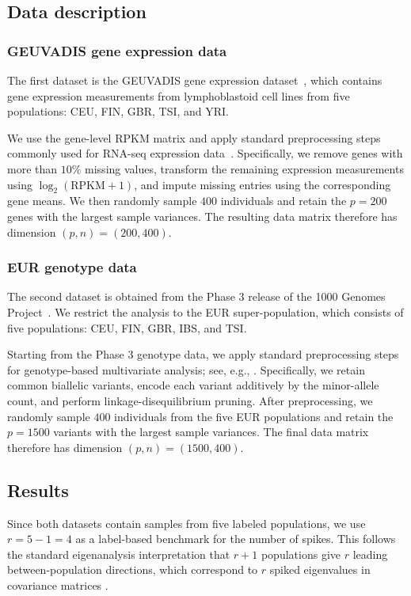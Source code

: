 \documentclass[12pt]{article}
\theoremstyle{plain}
\numberwithin{equation}{section}
\begin{document}
				\subsection{Data description}
				\subsubsection{GEUVADIS gene expression data}
				The first dataset is the GEUVADIS gene expression dataset~\citep{lappalainen2013transcriptome}, which contains gene expression measurements from lymphoblastoid cell lines from five populations: CEU, FIN, GBR, TSI, and YRI.
				
				We use the gene-level RPKM matrix and apply standard preprocessing steps commonly used for RNA-seq expression data~\citep{watanabe2019genetic}. Specifically, we remove genes with more than $10\%$ missing values, transform the remaining expression measurements using $\log_2(\mathrm{RPKM}+1)$, and impute missing entries using the corresponding gene means. We then randomly sample $400$ individuals and retain the $p=200$ genes with the largest sample variances. The resulting data matrix therefore has dimension $(p,n)=(200,400)$.
				
				\subsubsection{EUR genotype data}
				The second dataset is obtained from the Phase 3 release of the 1000 Genomes Project~\citep{1000Genomes2015}. We restrict the analysis to the EUR super-population, which consists of five  populations: CEU, FIN, GBR, IBS, and TSI.
				
				Starting from the Phase 3 genotype data, we apply standard preprocessing steps for genotype-based multivariate analysis; see, e.g., \cite{prive2020efficient,chang2015second,ke2023estimation}. Specifically, we retain common biallelic variants, encode each variant additively by the minor-allele count, and perform linkage-disequilibrium pruning. After preprocessing, we randomly sample $400$ individuals from the five EUR populations and retain the $p=1500$ variants with the largest sample variances. The final data matrix therefore has dimension $(p,n)=(1500,400)$.
				
				\subsection{Results}
				Since both datasets contain samples from five labeled populations, we use $r=5-1=4$ as a label-based benchmark for the number of spikes. This follows the standard eigenanalysis interpretation that $r+1$ populations give $r$ leading between-population directions, which correspond to $r$ spiked eigenvalues in covariance matrices \citep{patterson2006population,ke2023estimation}.
				
\end{document}
